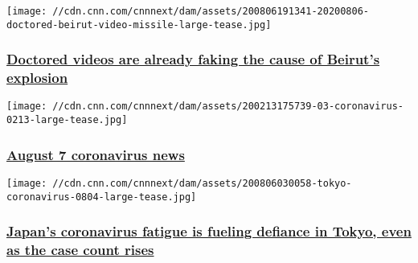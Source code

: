 \href{/2020/08/06/world/fake-beirut-video-missile-intl-trnd/index.html}{}

\texttt{[image: //cdn.cnn.com/cnnnext/dam/assets/200806191341-20200806-doctored-beirut-video-missile-large-tease.jpg]}

\hypertarget{doctored-videos-are-already-faking-the-cause-of-beiruts-explosion}{%
\subsubsection{\texorpdfstring{\href{/2020/08/06/world/fake-beirut-video-missile-intl-trnd/index.html}{Doctored
videos are already faking the cause of Beirut's
explosion}}{Doctored videos are already faking the cause of Beirut's explosion}}\label{doctored-videos-are-already-faking-the-cause-of-beiruts-explosion}}

\href{/world/live-news/coronavirus-pandemic-08-07-20-intl/index.html}{}

\texttt{[image: //cdn.cnn.com/cnnnext/dam/assets/200213175739-03-coronavirus-0213-large-tease.jpg]}

\hypertarget{august-7-coronavirus-news}{%
\subsubsection{\texorpdfstring{\href{/world/live-news/coronavirus-pandemic-08-07-20-intl/index.html}{August
7 coronavirus
news}}{August 7 coronavirus news}}\label{august-7-coronavirus-news}}

\href{/2020/08/07/asia/tokyo-coronavirus-fatigue-intl-hnk/index.html}{}

\texttt{[image: //cdn.cnn.com/cnnnext/dam/assets/200806030058-tokyo-coronavirus-0804-large-tease.jpg]}

\hypertarget{japans-coronavirus-fatigue-is-fueling-defiance-in-tokyo-even-as-the-case-count-rises-2}{%
\subsubsection{\texorpdfstring{\href{/2020/08/07/asia/tokyo-coronavirus-fatigue-intl-hnk/index.html}{Japan's
coronavirus fatigue is fueling defiance in Tokyo, even as the case count
rises}}{Japan's coronavirus fatigue is fueling defiance in Tokyo, even as the case count rises}}\label{japans-coronavirus-fatigue-is-fueling-defiance-in-tokyo-even-as-the-case-count-rises-2}}

\href{/videos/us/2020/08/07/leslie-jordan-quarantine-acfc-full-episode-vpx.cnn}{}

